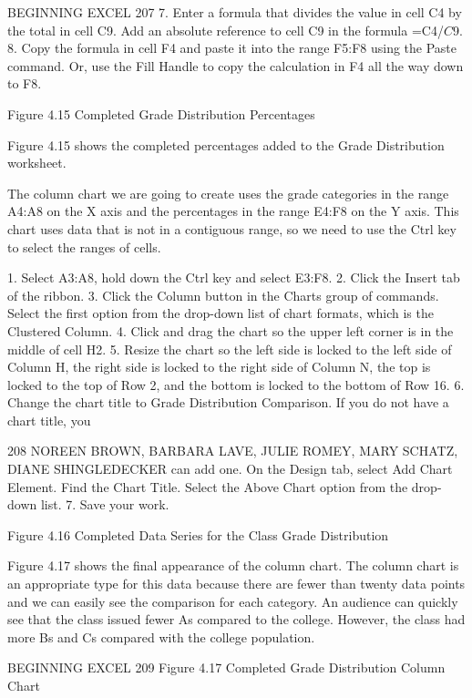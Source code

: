 BEGINNING EXCEL 207
7. Enter a formula that divides the value in cell C4 by the total in cell C9. Add an absolute reference
to cell C9 in the formula =C4/$C$9.
8. Copy the formula in cell F4 and paste it into the range F5:F8 using the Paste command.
Or, use the Fill Handle to copy the calculation in F4 all the way down to F8.




Figure 4.15 Completed Grade Distribution Percentages


Figure 4.15 shows the completed percentages added to the Grade Distribution worksheet.

The column chart we are going to create uses the grade categories in the range A4:A8 on the X axis
and the percentages in the range E4:F8 on the Y axis. This chart uses data that is not in a contiguous
range, so we need to use the Ctrl key to select the ranges of cells.

1. Select A3:A8, hold down the Ctrl key and select E3:F8.
2. Click the Insert tab of the ribbon.
3. Click the Column button in the Charts group of commands. Select the first option from the
drop-down list of chart formats, which is the Clustered Column.
4. Click and drag the chart so the upper left corner is in the middle of cell H2.
5. Resize the chart so the left side is locked to the left side of Column H, the right side is locked to
the right side of Column N, the top is locked to the top of Row 2, and the bottom is locked to the
bottom of Row 16.
6. Change the chart title to Grade Distribution Comparison. If you do not have a chart title, you


208 NOREEN BROWN, BARBARA LAVE, JULIE ROMEY, MARY SCHATZ, DIANE SHINGLEDECKER
can add one. On the Design tab, select Add Chart Element. Find the Chart Title. Select the
Above Chart option from the drop-down list.
7. Save your work.




Figure 4.16 Completed Data Series for the Class Grade Distribution


Figure 4.17 shows the final appearance of the column chart. The column chart is an appropriate type
for this data because there are fewer than twenty data points and we can easily see the comparison
for each category. An audience can quickly see that the class issued fewer As compared to the college.
However, the class had more Bs and Cs compared with the college population.




BEGINNING EXCEL 209
Figure 4.17 Completed Grade Distribution Column Chart




